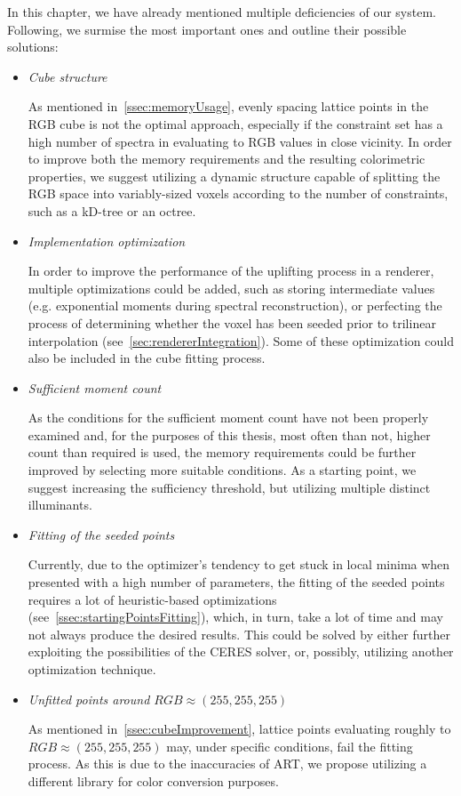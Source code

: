 In this chapter, we have already mentioned multiple deficiencies of our system. Following, we surmise the most important ones and outline their possible solutions:
\begin{itemize}
	\item{\emph{Cube structure}}
	
	As mentioned in~\cref{ssec:memoryUsage}, evenly spacing lattice points in the RGB cube is not the optimal approach, especially if the constraint set has a high number of spectra in evaluating to RGB values in close vicinity. In order to improve both the memory requirements and the resulting colorimetric properties, we suggest utilizing a dynamic structure capable of splitting the RGB space into variably-sized voxels according to the number of constraints, such as a kD-tree or an octree.
	
	\item{\emph{Implementation optimization}}
	
	In order to improve the performance of the uplifting process in a renderer, multiple optimizations could be added, such as storing intermediate values (e.g. exponential moments during spectral reconstruction), or perfecting the process of determining whether the voxel has been seeded prior to trilinear interpolation (see~\cref{sec:rendererIntegration}). Some of these optimization could also be included in the cube fitting process.
	
	\item{\emph{Sufficient moment count}}
	
	As the conditions for the sufficient moment count have not been properly examined and, for the purposes of this thesis, most often than not, higher count than required is used, the memory requirements could be further improved by selecting more suitable conditions. As a starting point, we suggest increasing the sufficiency threshold, but utilizing multiple distinct illuminants.
	
	\item{\emph{Fitting of the seeded points}}
	
	Currently, due to the optimizer's tendency to get stuck in local minima when presented with a high number of parameters, the fitting of the seeded points requires a lot of heuristic-based optimizations (see~\cref{ssec:startingPointsFitting}), which, in turn, take a lot of time and may not always produce the desired results. This could be solved by either further exploiting the possibilities of the CERES solver, or, possibly, utilizing another optimization technique.

	\item{\emph{Unfitted points around $RGB\approx(255, 255, 255)$}}
	
	As mentioned in~\cref{ssec:cubeImprovement}, lattice points evaluating roughly to $RGB\approx(255, 255, 255)$ may, under specific conditions, fail the fitting process. As this is due to the inaccuracies of ART, we propose utilizing a different library for color conversion purposes.
	
\end{itemize}